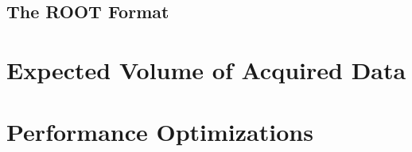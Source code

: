 \subsection{The ROOT Format}

\section{Expected Volume of Acquired Data}

\section{Performance Optimizations}
